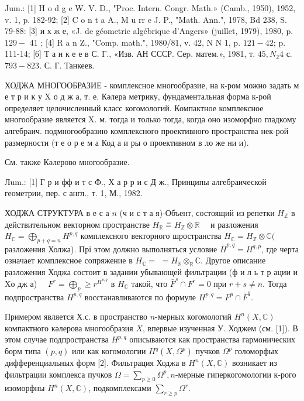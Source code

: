 \documentclass[10pt]{article}
\begin{document}
Jum.: [1] H o d g e W. V. D., "Proc. Intern. Congr. Math.» (Camb., 1950), 1952, v. 1, p. 182-92; [2] C o n t a A., M u rr e J. P., "Math. Ann.", 1978, Bd 238, S. 79-88: [3] и х ж е, «J. de géometrie algébrique d'Angers» (juillet, 1979), 1980, p. $129-$ 41 ; [4] R a n Z., "Comp. math.", 1980/81, v. 42, N N 1, p. $121-42$; p. 111-14; [6] Т а н к е е в С. Г., «Изв. АН СССР. Сеp. матем.», 1981, т. $45, N_{2} 4$ с. $793-823$. С. Г. Танкеев.



ХОДЖА МНОГООБРАЗИЕ - комплексное многообразие, на к-ром можно задать м е т р и к у X о д ж а, т. е. Кәлера метрику, фундаментальная форма к-рой определяет целочисленный класс когомологий. Компактное комплексное многообразие является X. м. тогда и только тогда, когда оно изоморфно гладкому алгебраич. подмногообразию комплексного проективного пространства нек-рой размерности (т е о р е м а Код а и ры о проективном в ло же ни и).



См. также Кәлерово многообразие.



Лum.: [1] Г р и фф и т с Ф., Х а р р и с Д ж., Принципы алгебраической геометрии, пер. с англ., т. 1, М., 1982.



ХОДЖА СТРУКТУРА в е с а $n$ (ч и с т а я)-Объент, состоящий из репетки $H_{\mathbb{Z}}$ в действительном векторном пространстве $H_{\mathbb{R}} \stackrel{=}{=} H_{\mathbb{Z}} \otimes \mathbb{R} \quad$ и разложения $H_{\mathbb{C}}=\bigoplus_{p+q=n} H^{p, q}$ комплексного векторного шространства $H_{\mathbb{C}}=H_{\mathbb{Z}} \otimes \mathbb{C}($ разложения Холжа). Прі этом должно выполняться условие $\bar{H}^{p, q}=H^{q, p}$, где черта означает комплексное сопряжение в $H_{\mathbb{C}}=$ $=H_{\mathbb{R}} \otimes_{\mathbb{R}} \mathbb{C}$. Другое описание разложения Ходжа состоит в задании убывающей фильтрации (ф и л ь т р ации и $\mathrm{X} о$ дж а) $\quad F^{r}=\bigoplus_{p} \geqslant r^{H^{p, q}}$ в $H_{\mathbb{C}}$ такой, что $\bar{F}^{s} \cap F^{r}=0$ при $r+s \neq n$. Тогда подпространства $H^{p, q}$ восстанавливаются по формуле $H^{p, q}=F^{p} \cap \bar{F}^{q}$.



Примером является Х.с. в пространство $n$-мерных когомологий $H^{n}(X, \mathbb{C})$ компактного кәлерова многообразия $X$, впервые изученная У. Ходжем (см. [1]). В этом случае подпространства $H^{p, q}$ описываются как пространства гармонических борм типа $(p, q)$ или как когомологии $H^{q}\left(X, \Omega^{p}\right)$ пучков $\Omega^{p}$ голоморфых дифференциальных форм [2]. Фильтрация Ходжа в $H^{n}(X, \mathbb{C})$ возникает из фильтрации комплекса пучков $\Omega=\sum_{p \geqslant 0} \Omega^{p}, n$-мерные гиперкогомологии к-рого изоморфны $H^{n}(X, \mathbb{C})$, подкомплексами $\sum_{r \geqslant p} \Omega^{r}$.
\end{document}

